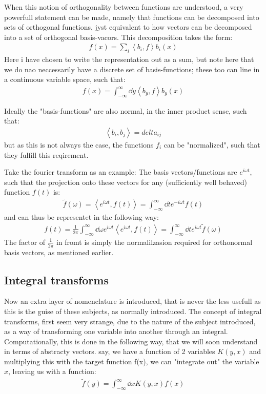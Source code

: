\documentclass[a4paper,twoside]{article}
\newcommand{\innerp}[2]{\left\langle #1 , #2 \right\rangle}
\begin{document}
When this notion of orthogonality between functions are understood, a very powerfull statement can be made, namely that functions can be decomposed into sets of orthogonal functions, jyst equivalent to how vectors can be decomposed into a set of orthogonal basis-vacors. 
This decomposition takes the form:
\begin{align*}
    f(x) = \sum_{i} \innerp{b_{i}}{f} b_{i}(x)
\end{align*}
Here i have chosen to write the representation out as a sum, but note here that we do nao neccessarily have a discrete set of basis-functions; these too can line in a continuous variable space, such that:
\begin{align*}
    f(x) = \int_{-\infty}^{\infty} \dd y \innerp{b_{y}}{f} b_{y}(x)
\end{align*}


Ideally the "basis-functions" are also normal, in the inner product sense, such that:
\begin{align*}
    \innerp{b_{i}}{b_{j}} = delta_{ij}
\end{align*}
but as this is not always the case, the functions $f_{i}$ can be "normalized", such that they fulfill this reqirement. 

Take the fourier transform as an example: 
The basis vectors/functions are $e^{i \omega t}$, such that the projection onto these vectors for any (sufficiently well behaved) function $f(t)$ is:
\begin{align*}
    \tilde{f}(\omega) = \innerp{e^{i \omega t}}{f(t)} = \int_{-\infty}^{\infty} \dd t e^{- i \omega t} f(t)
\end{align*}
and can thus be representet in the following way:
\begin{align*}
    f(t) = \frac{1}{2 \pi} \int_{-\infty}^{\infty} \dd \omega e^{i \omega t} \innerp{e^{i \omega t}}{f(t)} = \int_{-\infty}^{\infty} \dd t e^{i \omega t} \tilde{f}(\omega)
\end{align*}
The factor of $\frac{1}{2 \pi}$ in fromt is simply the normalilzasion required for orthonormal basis vectors, as mentioned earlier.

\subsection{Integral transforms}
Now an extra layer of nomenclature is introduced, that is never the less usefull as this is the guise of these subjects, as normally introduced. 
The concept of integral transforms, first seem very strange, due to the nature of the subject introduced, as a way of transforming one variable into another through an integral. 
Computationally, this is done in the following way, that we will soon understand in terms of abstracty vectors. 
say, we have a function of 2 variables $K(y, x)$ and multiplying this with the target function f(x), we can "integrate out" the variable $x$, leaving us with a function:
\begin{align*}
    \tilde{f}(y) = \int_{-\infty}^{\infty} \dd x K(y, x) f(x)
\end{align*}
\end{document}
